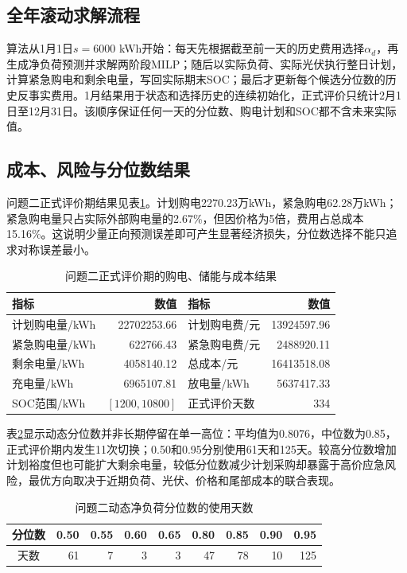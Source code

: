 \documentclass[UTF8,a4paper,12pt,fontset=fandol]{ctexart}
\numberwithin{equation}{section}
\begin{document}
\subsection{全年滚动求解流程}

算法从1月1日$s=6000$ kWh开始：每天先根据截至前一天的历史费用选择$\alpha_d$，再生成净负荷预测并求解两阶段MILP；随后以实际负荷、实际光伏执行整日计划，计算紧急购电和剩余电量，写回实际期末SOC；最后才更新每个候选分位数的历史反事实费用。1月结果用于状态和选择历史的连续初始化，正式评价只统计2月1日至12月31日。该顺序保证任何一天的分位数、购电计划和SOC都不含未来实际值。

\subsection{成本、风险与分位数结果}

问题二正式评价期结果见表\ref{tab:q2-results}。计划购电2270.23万kWh，紧急购电62.28万kWh；紧急购电量只占实际外部购电量的2.67\%，但因价格为5倍，费用占总成本15.16\%。这说明少量正向预测误差即可产生显著经济损失，分位数选择不能只追求对称误差最小。

\begin{table}[htbp]
\centering
\small
\caption{问题二正式评价期的购电、储能与成本结果}\label{tab:q2-results}
\begin{tabular}{lr@{\qquad}lr}
\toprule
指标 & 数值 & 指标 & 数值\\
\midrule
计划购电量/kWh & 22702253.66 & 计划购电费/元 & 13924597.96\\
紧急购电量/kWh & 622766.43 & 紧急购电费/元 & 2488920.11\\
剩余电量/kWh & 4058140.12 & 总成本/元 & 16413518.08\\
充电量/kWh & 6965107.81 & 放电量/kWh & 5637417.33\\
SOC范围/kWh & $[1200,10800]$ & 正式评价天数 & 334\\
\bottomrule
\end{tabular}
\end{table}

表\ref{tab:q2-alpha}显示动态分位数并非长期停留在单一高位：平均值为0.8076，中位数为0.85，正式评价期内发生11次切换；0.50和0.95分别使用61天和125天。较高分位数增加计划裕度但也可能扩大剩余电量，较低分位数减少计划采购却暴露于高价应急风险，最优方向取决于近期负荷、光伏、价格和尾部成本的联合表现。

\begin{table}[htbp]
\centering
\small
\caption{问题二动态净负荷分位数的使用天数}\label{tab:q2-alpha}
\begin{tabular}{crrrrrrrr}
\toprule
分位数 & 0.50 & 0.55 & 0.60 & 0.65 & 0.80 & 0.85 & 0.90 & 0.95\\
\midrule
天数 & 61 & 7 & 3 & 3 & 47 & 78 & 10 & 125\\
\bottomrule
\end{tabular}
\end{table}
\end{document}
